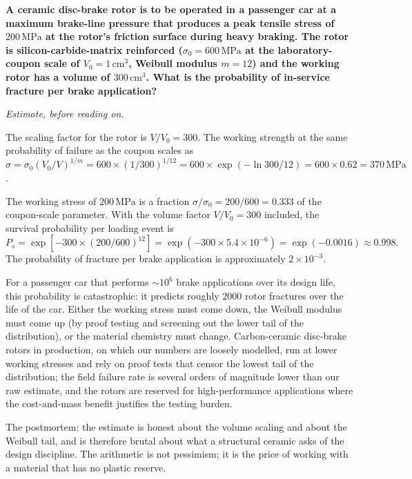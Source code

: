 \begin{estimation}
\textbf{A ceramic disc-brake rotor is to be operated in a passenger
car at a maximum brake-line pressure that produces a peak tensile
stress of $200\,\text{MPa}$ at the rotor's friction surface during
heavy braking. The rotor is silicon-carbide-matrix reinforced
($\sigma_0 = 600\,\text{MPa}$ at the laboratory-coupon scale of
$V_0 = 1\,\text{cm}^3$, Weibull modulus $m = 12$) and the working
rotor has a volume of $300\,\text{cm}^3$. What is the probability of
in-service fracture per brake application?}

\smallskip
\textit{Estimate, before reading on.}

\smallskip
The scaling factor for the rotor is $V/V_0 = 300$. The working
strength at the same probability of failure as the coupon scales as
$\sigma = \sigma_0 (V_0/V)^{1/m} = 600 \times (1/300)^{1/12}
= 600 \times \exp(-\ln 300 / 12) = 600 \times 0.62 = 370\,\text{MPa}$.

The working stress of $200\,\text{MPa}$ is a fraction
$\sigma/\sigma_0 = 200/600 = 0.333$ of the coupon-scale parameter.
With the volume factor $V/V_0 = 300$ included, the survival probability
per loading event is
\[
P_s = \exp\!\left[-300 \times (200/600)^{12}\right]
= \exp(-300 \times 5.4 \times 10^{-6}) = \exp(-0.0016) \approx 0.998.
\]
The probability of fracture per brake application is approximately
$2 \times 10^{-3}$.

For a passenger car that performs $\sim 10^6$ brake applications over
its design life, this probability is catastrophic: it predicts roughly
$2000$ rotor fractures over the life of the car. Either the working
stress must come down, the Weibull modulus must come up (by proof
testing and screening out the lower tail of the distribution), or the
material chemistry must change. Carbon-ceramic disc-brake rotors in
production, on which our numbers are loosely modelled, run at lower
working stresses and rely on proof tests that censor the lowest tail
of the distribution; the field failure rate is several orders of
magnitude lower than our raw estimate, and the rotors are reserved for
high-performance applications where the cost-and-mass benefit
justifies the testing burden.

The postmortem: the estimate is honest about the volume scaling and
about the Weibull tail, and is therefore brutal about what a structural
ceramic asks of the design discipline. The arithmetic is not pessimism;
it is the price of working with a material that has no plastic reserve.
\end{estimation}


